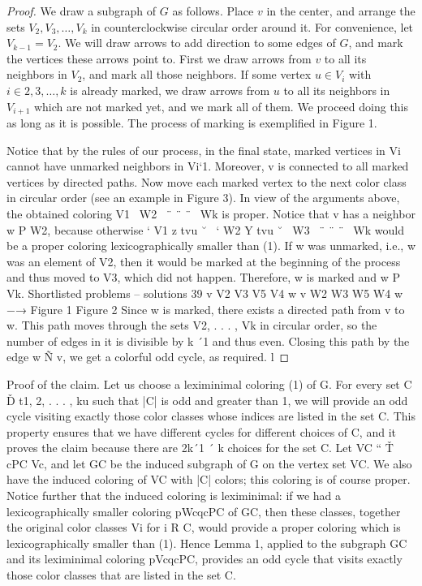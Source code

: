\begin{problem}
\begin{proof}
We draw a subgraph of $G$ as follows. Place $v$ in the center, and arrange the sets $V_2, V_3, \dots , V_k$ in counterclockwise circular order around it. For convenience, let $V_{k-1} = V_2$. We will draw arrows to add direction to some edges of $G$, and mark the vertices these arrows point to. First we draw arrows from $v$ to all its neighbors in $V_2$, and mark all those neighbors. If some vertex $u \in V_i$ with $i \in {2, 3, \dots , k}$ is already marked, we draw arrows from $u$ to all its neighbors in $V_{i+1}$ which are not marked yet, and we mark all of them. We proceed doing this as long as it is possible. The process of marking is exemplified in Figure 1.

Notice that by the rules of our process, in the final state, marked vertices in Vi cannot have
unmarked neighbors in Vi`1. Moreover, v is connected to all marked vertices by directed paths.
Now move each marked vertex to the next color class in circular order (see an example in
Figure 3). In view of the arguments above, the obtained coloring V1 \ W2 \ ¨ ¨ ¨ \ Wk is proper.
Notice that v has a neighbor w P W2, because otherwise
`
V1 z tvu
˘
\
`
W2 Y tvu
˘
\ W3 \ ¨ ¨ ¨ \ Wk
would be a proper coloring lexicographically smaller than (1). If w was unmarked, i.e., w was
an element of V2, then it would be marked at the beginning of the process and thus moved
to V3, which did not happen. Therefore, w is marked and w P Vk.
Shortlisted problems – solutions 39
v
V2 V3
V5 V4
w
v
W2 W3
W5 W4
w
−→
Figure 1 Figure 2
Since w is marked, there exists a directed path from v to w. This path moves through the
sets V2, . . . , Vk in circular order, so the number of edges in it is divisible by k ´1 and thus even.
Closing this path by the edge w Ñ v, we get a colorful odd cycle, as required. l
\end{proof}

Proof of the claim. Let us choose a leximinimal coloring (1) of G. For every set C Ď t1, 2, . . . , ku
such that |C| is odd and greater than 1, we will provide an odd cycle visiting exactly those
color classes whose indices are listed in the set C. This property ensures that we have different
cycles for different choices of C, and it proves the claim because there are 2k´1 ´ k choices for
the set C.
Let VC “
Ť
cPC
Vc, and let GC be the induced subgraph of G on the vertex set VC. We
also have the induced coloring of VC with |C| colors; this coloring is of course proper. Notice
further that the induced coloring is leximinimal: if we had a lexicographically smaller coloring
pWcqcPC of GC, then these classes, together the original color classes Vi
for i R C, would provide
a proper coloring which is lexicographically smaller than (1). Hence Lemma 1, applied to the
subgraph GC and its leximinimal coloring pVcqcPC, provides an odd cycle that visits exactly
those color classes that are listed in the set C. 

\end{problem}
%
\filbreak

